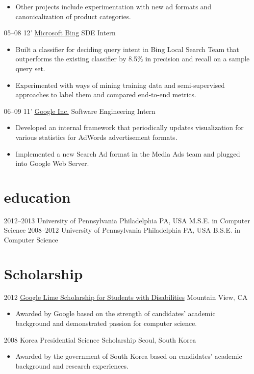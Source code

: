 \documentclass[]{patyoon-cv}
\begin{document}
\begin{entrylist}
{\begin{itemize}
    \item Other projects include experimentation with new ad formats and canonicalization of product categories.
    \end{itemize}
  }
  \entry
  {05–08 12'}
  {\href{http://bing.com/}{Microsoft Bing}}
  {SDE Intern}
  {\begin{itemize}
    \item Built a classifier for deciding query intent in Bing Local Search Team that outperforms the existing classifier by 8.5\% in precision and recall on a sample query set.
    \item Experimented with ways of mining training data and semi-supervised approaches to label them and compared end-to-end metrics.
    \end{itemize}}
  \entry
  {06–09 11'}
  {\href{http://www.google.com}{Google Inc.}}
  {Software Engineering Intern}
  {\begin{itemize}
    \item Developed an internal framework that periodically updates visualization for various statistics for AdWords advertisement formats.
    \item Implemented a new Search Ad format in the Media Ads team and plugged into Google Web Server.
    \end{itemize}}
\end{entrylist}

\section{education}

\begin{entrylist}
  \entry
  {2012–2013}
  {University of Pennsylvania}
  {Philadelphia PA, USA}
  {M.S.E. in Computer Science}
  \entry
  {2008–2012}
  {University of Pennsylvania}
  {Philadelphia PA, USA}
  {B.S.E. in Computer Science}
\end{entrylist}

\section{Scholarship}

\begin{entrylist}
  \entry
  {2012} {\href{http://www.limeconnect.com/opportunities/page/google-lime-scholarship-program}
    {Google Lime Scholarship for Students with Disabilities}}
  {Mountain View, CA}
  {\begin{itemize}
    \item Awarded by Google based on the strength of candidates' academic background and demonstrated passion for computer science.
    \end{itemize}
  }
  \entry
  {2008}
  {Korea Presidential Science Scholarship}
  {Seoul, South Korea}
  {\begin{itemize}
    \item Awarded by the government of South Korea based on candidates' academic background and research experiences.
    \end{itemize}
  }
\end{entrylist}
\end{document}
